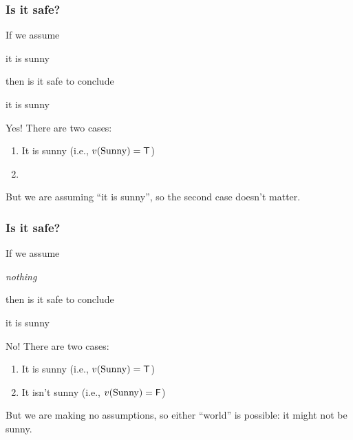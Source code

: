 \documentclass[xetex,aspectratio=169,14pt,hyperref={pdfpagelabels=true,pdflang={en-GB}}]{beamer}
\begin{document}
\begin{frame}[t]
  \frametitle{Is it safe?}

  If we assume
  \begin{center}
    it is sunny
  \end{center}
  then is it safe to conclude
  \begin{center}
    it is sunny
  \end{center}

  \bigskip
  \pause

  Yes! \pause There are two cases:
  \begin{enumerate}
  \item It is sunny  (i.e., $v(\mathrm{Sunny}) = \mathsf{T}$)
  \item {}
  \end{enumerate}
  \pause But we are assuming ``it is sunny'', so the second case
  doesn't matter.
\end{frame}

\begin{frame}[t]
  \frametitle{Is it safe?}

  If we assume
  \begin{center}
    \emph{nothing}
  \end{center}
  then is it safe to conclude
  \begin{center}
    it is sunny
  \end{center}

  \bigskip
  \pause

  No! \pause There are two cases:
  \begin{enumerate}
  \item It is sunny  (i.e., $v(\mathrm{Sunny}) = \mathsf{T}$)
  \item It isn't sunny (i.e., $v(\mathrm{Sunny}) = \mathsf{F}$)
  \end{enumerate}
  \pause But we are making no assumptions, so either ``world'' is
  possible: it might not be sunny.
\end{frame}
\end{document}
